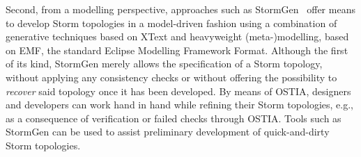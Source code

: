 Second, from a modelling perspective, approaches such as StormGen~\cite{stormgen} offer means to develop Storm topologies in a model-driven fashion using a combination of generative techniques based on XText and heavyweight (meta-)modelling, based on EMF, the standard Eclipse Modelling Framework Format. Although the first of its kind, StormGen merely allows the specification of a Storm topology, without applying any consistency checks or without offering the possibility to \emph{recover} said topology once it has been developed. By means of OSTIA, designers and developers can work hand in hand while refining their Storm topologies, e.g., as a consequence of verification or failed checks through OSTIA. Tools such as StormGen can be used to assist preliminary development of quick-and-dirty Storm topologies.

